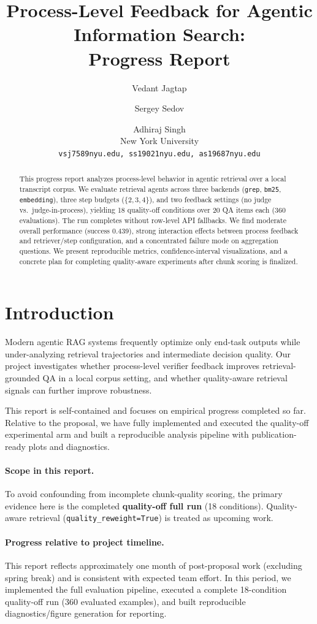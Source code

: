 \documentclass[11pt]{article}
\title{Process-Level Feedback for Agentic Information Search:\\
Progress Report}
\author{
Vedant Jagtap \and Sergey Sedov \and Adhiraj Singh \\
New York University \\
\texttt{vsj7589\symbol{64}nyu.edu, ss19021\symbol{64}nyu.edu, as19687\symbol{64}nyu.edu}
}
\begin{document}
\maketitle

\begin{abstract}
This progress report analyzes process-level behavior in agentic retrieval over a local transcript corpus. We evaluate retrieval agents across three backends (\texttt{grep}, \texttt{bm25}, \texttt{embedding}), three step budgets ($\{2,3,4\}$), and two feedback settings (no judge vs.\ judge-in-process), yielding 18 quality-off conditions over 20 QA items each (360 evaluations). The run completes without row-level API fallbacks. We find moderate overall performance (success 0.439), strong interaction effects between process feedback and retriever/step configuration, and a concentrated failure mode on aggregation questions. We present reproducible metrics, confidence-interval visualizations, and a concrete plan for completing quality-aware experiments after chunk scoring is finalized.
\end{abstract}

\section{Introduction}
Modern agentic RAG systems frequently optimize only end-task outputs while under-analyzing retrieval trajectories and intermediate decision quality. Our project investigates whether process-level verifier feedback improves retrieval-grounded QA in a local corpus setting, and whether quality-aware retrieval signals can further improve robustness.

This report is self-contained and focuses on empirical progress completed so far. Relative to the proposal, we have fully implemented and executed the quality-off experimental arm and built a reproducible analysis pipeline with publication-ready plots and diagnostics.

\paragraph{Scope in this report.}
To avoid confounding from incomplete chunk-quality scoring, the primary evidence here is the completed \textbf{quality-off full run} (18 conditions). Quality-aware retrieval (\texttt{quality\_reweight=True}) is treated as upcoming work.

\paragraph{Progress relative to project timeline.}
This report reflects approximately one month of post-proposal work (excluding spring break) and is consistent with expected team effort. In this period, we implemented the full evaluation pipeline, executed a complete 18-condition quality-off run (360 evaluated examples), and built reproducible diagnostics/figure generation for reporting.
\end{document}
